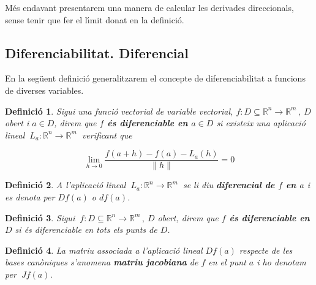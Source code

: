 \documentclass[12pt]{article}
\newtheorem{definicio}{Definici{\'o}}[subsection]
\newcommand{\R}{\mathbb{R}}
\begin{document}
\vspace{0.3cm}
M{\'e}s endavant presentarem una manera de calcular les derivades direccionals,
sense tenir que fer el l{\'\i}mit donat en la definici{\'o}.

\subsection{Diferenciabilitat. Diferencial}

En la seg{\"u}ent definici{\'o} generalitzarem el concepte de diferenciabilitat a
funcions de diverses variables.

\vspace{0.4cm}
\begin{definicio}
Sigui una funci{\'o} vectorial de variable vectorial,
$f:D \subseteq \R^{n} \longrightarrow \R^m\,,\ D$
obert i $a \in D $, direm que \textbf{$f$ {\'e}s diferenciable en
$a \in D $} si existeix una aplicaci{\'o} lineal $\ L_a: \R^{n}
\longrightarrow \R^m\ $ verificant que

\[
\lim_{h \to 0} \frac{f(a+h) - f(a) - L_a(h) }{\| h \|} = 0
\]
\end{definicio}


\vspace{0.4cm}
\begin{definicio}
A l'aplicaci{\'o} lineal $\ L_a: \R^{n} \longrightarrow \R^m\ $ se li
diu \textbf{diferencial de $f$ en $a$} i es denota
per $Df(a)$ o $df(a)$.
\end{definicio}

\vspace{0.4cm}
\begin{definicio}
Sigui
$\ f:D \subseteq \R^{n} \longrightarrow \R^m\,,\ D$
obert, direm que \textbf{$f$ {\'e}s diferenciable en $D$}  si {\'e}s diferenciable en tots els punts de $D$.
\end{definicio}


\vspace{0.4cm}
\begin{definicio}
La matriu associada a l'aplicaci{\'o} lineal $Df(a)$ respecte de les bases can{\`o}niques s'anomena \textbf{matriu jacobiana} de $f$  en el punt $a$ i ho denotam per $\ Jf(a)$.
\end{definicio}
\end{document}
